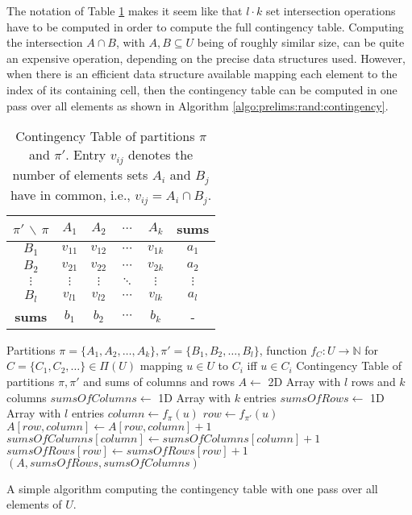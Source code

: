 		The notation of Table \ref{fig:prelims:rand:contingency} makes it seem like that $l \cdot k$ set intersection operations have to be computed in order to compute the full contingency table.
		Computing the intersection $A \cap B$, with $A, B \subseteq U$ being of roughly similar size, can be quite an expensive operation, depending on the precise data structures used.
		However, when there is an efficient data structure available mapping each element to the index of its containing cell, then the contingency table can be computed in one pass over all elements as shown in Algorithm \ref{algo:prelims:rand:contingency}.

		\begin{table}[h!]
			\centering
			\begin{tabular}{c|cccc|c}
				$\pi'$ $\backslash$ $\pi$ & $A_1$ & $A_2$ & $\ldots$ & $A_k$ & \textbf{sums} \\
				\toprule
				$B_1$ & $v_{11}$ & $v_{12}$ & $\cdots$ & $v_{1k}$ & $a_1$ \\
				$B_2$ & $v_{21}$ & $v_{22}$ & $\cdots$ & $v_{2k}$ & $a_2$ \\
				$\vdots$ & $\vdots$ & $\vdots$ & $\ddots$ & $\vdots$ & $\vdots$\\
				$B_l$ & $v_{l1}$ & $v_{l2}$ & $\cdots$ & $v_{lk}$ & $a_l$ \\
				\midrule
				\textbf{sums} & $b_1$ & $b_2$ & $\cdots$ & $b_k$ & -
			\end{tabular}
			\caption{Contingency Table of partitions $\pi$ and $\pi'$. Entry $v_{ij}$ denotes the number of elements sets $A_i$ and $B_j$ have in common, i.e., $v_{ij} = A_i \cap B_j$.}
			\label{fig:prelims:rand:contingency}
		\end{table}

		\begin{algorithm}[ht!]
			\centering
			\begin{algorithmic}
				\Require Partitions $\pi = \{ A_1, A_2, \ldots, A_k \}, \pi' = \{ B_1, B_2, \ldots, B_l \}$, function $f_C: U \rightarrow \mathbb{N}$ for $C = \{ C_1, C_2, \ldots \} \in \Pi(U)$ mapping $u \in U$ to $C_i$ iff $u \in C_i$
				\Ensure Contingency Table of partitions $\pi, \pi'$ and sums of columns and rows
				\Statex
					\State $A \gets$ 2D Array with $l$ rows and $k$ columns
					\State $sumsOfColumns \gets$ 1D Array with $k$ entries
					\State $sumsOfRows \gets$ 1D Array with $l$ entries
						\State $column \gets f_\pi(u)$
						\State $row \gets f_{\pi'}(u)$
						\Statex
						\State $A[row, column] \gets A[row, column] + 1$
						\State $sumsOfColumns[column] \gets sumsOfColumns[column] + 1$
						\State $sumsOfRows[row] \gets sumsOfRows[row] + 1$
					\EndFor
					\State \Return $(A, sumsOfRows, sumsOfColumns)$
				\EndFunction
			\end{algorithmic}
			\caption{A simple algorithm computing the contingency table with one pass over all elements of $U$.}
			\label{algo:prelims:rand:contingency}
		\end{algorithm}

